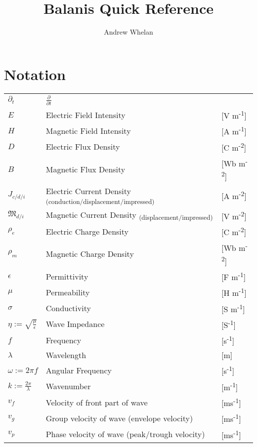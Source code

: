 \documentclass{article}
\title{Balanis Quick Reference}
\author{Andrew Whelan}
\date{}
\begin{document}
\maketitle
\thispagestyle{empty}
\setcounter{page}{0}

\tableofcontents

\newpage

\section*{Notation}
\small
\begin{tabular}{ m{5em} m{24em} m{4em} }
    \( \partial_t \) & \( \displaystyle \frac{\partial}{\partial t}\) & \\
    \( E \) & Electric Field Intensity & [V m\textsuperscript{-1}] \\
    \( H \) & Magnetic Field Intensity & [A m\textsuperscript{-1}] \\
    \( D \) & Electric Flux Density & [C m\textsuperscript{-2}] \\
    \( B \) & Magnetic Flux Density & [Wb m\textsuperscript{-2}] \\
    \( \displaystyle J_{c/d/i} \) & Electric Current Density \textsubscript{(conduction/displacement/impressed)} & [A m\textsuperscript{-2}] \\
    \( \displaystyle \mathfrak{M}_{d/i} \) & Magnetic Current Density \textsubscript{(displacement/impressed)} & [V m\textsuperscript{-2}] \\
    \( \displaystyle \rho_{e} \) & Electric Charge Density & [C m\textsuperscript{-2}] \\
    \( \displaystyle \rho_{m} \) & Magnetic Charge Density & [Wb m\textsuperscript{-2}] \\
    \( \displaystyle \epsilon \) & Permittivity & [F m\textsuperscript{-1}] \\
    \( \displaystyle \mu \) & Permeability & [H m\textsuperscript{-1}] \\
    \( \displaystyle \sigma \) & Conductivity & [S m\textsuperscript{-1}] \\
    \( \displaystyle \eta := \sqrt{\frac{\mu}{\epsilon}} \) & Wave Impedance & [S\textsuperscript{-1}] \\
    \( \displaystyle f \) & Frequency & [s\textsuperscript{-1}] \\
    \( \displaystyle \lambda \) & Wavelength & [m] \\
    \( \displaystyle \omega := 2 \pi f \) & Angular Frequency & [s\textsuperscript{-1}] \\
    \( \displaystyle k := \frac{2 \pi}{\lambda} \) & Wavenumber & [m\textsuperscript{-1}]  \\
    \( \displaystyle v_f \) & Velocity of front part of wave & [ms\textsuperscript{-1}]  \\
    \( \displaystyle v_g \) & Group velocity of wave (envelope velocity) & [ms\textsuperscript{-1}]  \\
    \( \displaystyle v_p \) & Phase velocity of wave (peak/trough velocity) & [ms\textsuperscript{-1}]  \\
\end{tabular}
\normalsize
\newpage
\end{document}
